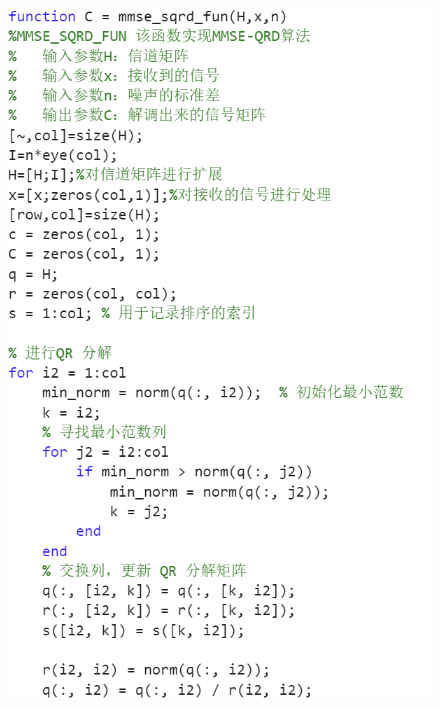 \documentclass[a4paper,12pt]{article}
\begin{document}
	\begin{figure}[h]
		\centering
		\begin{minipage}{0.45\textwidth}
			\centering
			\includegraphics[width=\textwidth]{3.png}
		\end{minipage}
		\qquad
		\begin{minipage}{0.45\textwidth}
			\centering

\end{minipage}
\end{figure}
\end{document}
